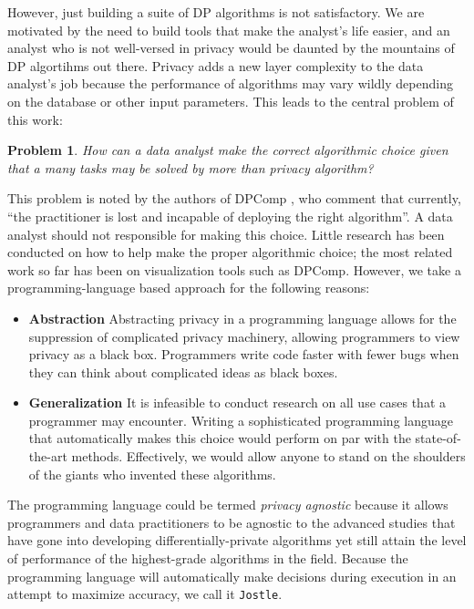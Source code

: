 \documentclass[11pt]{article}
\newtheorem{problem}{Problem}
\newcommand{\Jostle}{\texttt{Jostle}}
\begin{document}
However, just building a suite of DP algorithms is not satisfactory. We are motivated by the need to build tools that make the analyst's life easier, and an analyst who is not well-versed in privacy would be daunted by the mountains of DP algortihms out there. Privacy adds a new layer complexity to the data analyst's job because the performance of algorithms may vary wildly depending on the database or other input parameters. This leads to the central problem of this work: 
\begin{problem}\label{prob:1}
How can a data analyst make the correct algorithmic choice given that a many tasks may be solved by more than privacy algorithm?
\end{problem}
This problem is noted by the authors of DPComp \cite{Hay:2016}, who comment that currently, ``the practitioner is lost and incapable of deploying the right algorithm''. A data analyst should not responsible for making this choice. Little research has been conducted on how to help make the proper algorithmic choice; the most related work so far has been on visualization tools such as DPComp. However, we take a programming-language based approach for the following reasons:

\begin{itemize}
\item \textbf{Abstraction} Abstracting privacy in a programming language allows for the suppression of complicated privacy machinery, allowing programmers to view privacy as a black box. Programmers write code faster with fewer bugs when they can think about complicated ideas as black boxes.
\item \textbf{Generalization} It is infeasible to conduct research on all use cases that a programmer may encounter. Writing a sophisticated programming language that automatically makes this choice would perform on par with the state-of-the-art methods. Effectively, we would allow anyone to stand on the shoulders of the giants who invented these algorithms.
\end{itemize}

The programming language could be termed \emph{privacy agnostic} because it allows programmers and data practitioners to be agnostic to the advanced studies that have gone into developing differentially-private algorithms yet still attain the level of performance of the highest-grade algorithms in the field. Because the programming language will automatically make decisions during execution in an attempt to maximize accuracy, we call it \Jostle{}.
\end{document}
